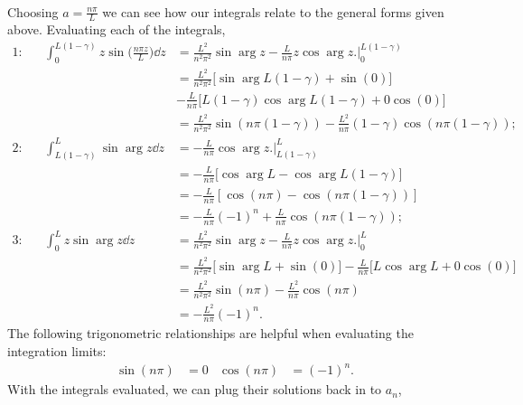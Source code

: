 \begin{enumerate}
\begin{align*}
    \end{align*}
    Choosing $a = \frac{n \pi}{L}$ we can see how our integrals relate to
    the general forms given above.
    Evaluating each of the integrals,
    \begin{align*}
        1: && \int_0^{L(1 - \gamma)}
          z \sin \biggl( \frac{n \pi z}{L} \biggr) \dd{z}
          &= \frac{L^2}{n^2 \pi^2} \sin \arg{z}
          - \frac{L}{n \pi} z \cos \arg{z}
          \Biggl. \Biggr|_0^{L(1 - \gamma)} \\
          && &= \frac{L^2}{n^2 \pi^2} \Biggl[ \sin \arg{L(1 - \gamma)}
          + \sin (0) \Biggr] \\
          && &- \frac{L}{n \pi} \Biggl[ L(1 - \gamma) \cos \arg{L(1 - \gamma)}
          + 0 \cos (0) \Biggr] \\
          && &= \frac{L^2}{n^2 \pi^2} \sin (n \pi (1 - \gamma))
          - \frac{L^2}{n \pi} (1 - \gamma) \cos (n \pi (1 - \gamma)) ;\\
        2: && \int_{L(1 - \gamma)}^L
          \sin \arg{z} \dd{z} &= - \frac{L}{n \pi} \cos \arg{z}
          \Biggl. \Biggr|_{L(1 - \gamma)}^{L} \\
          && &= - \frac{L}{n \pi} \Biggl[ \cos \arg{L} - \cos \arg{L(1 -
          \gamma)}\Biggr] \\
          && &= - \frac{L}{n \pi} [ \cos (n \pi) - \cos (n \pi (1 - \gamma)) ] \\
          && &= - \frac{L}{n \pi} (-1)^n + \frac{L}{n \pi} \cos (n \pi (1
          - \gamma)) ;\\
        3: && \int_0^L z \sin \arg{z} \dd{z}
          &= \frac{L^2}{n^2 \pi^2} \sin \arg{z} - \frac{L}{n \pi} z \cos \arg{z}
          \Biggl. \Biggr|_0^{L} \\
          && &= \frac{L^2}{n^2 \pi^2} \Biggl[ \sin \arg{L} + \sin (0) \Biggr] 
          - \frac{L}{n \pi} \Biggl[ L \cos \arg{L} + 0 \cos (0) \Biggr] \\
          && &= \frac{L^2}{n^2 \pi^2} \sin (n \pi) - \frac{L^2}{n \pi} \cos
          (n \pi) \\
          && &= - \frac{L^2}{n \pi} (-1)^n .
    \end{align*}
    The following trigonometric relationships are helpful when evaluating
    the integration limits:
    \begin{align*}
        \sin (n \pi) &= 0 & \cos (n \pi) &= (-1)^n .
    \end{align*}
    With the integrals evaluated, we can plug their solutions back in to
    $a_n$,
    \begin{align*}

\end{align*}
\end{enumerate}
